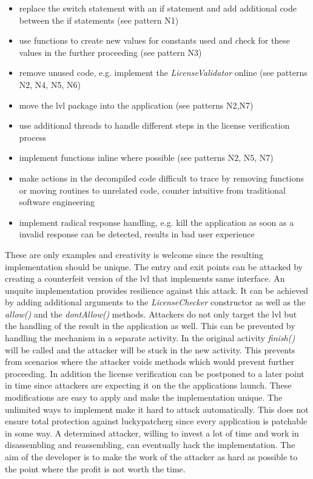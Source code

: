 \begin{itemize}
\item replace the switch statement with an if statement and add additional code between the if statements (see pattern N1)
\item use functions to create new values for constants used and check for these values in the further proceeding (see pattern N3)
\item remove unused code, e.g. implement the \textit{LicenseValidator} online (see patterns N2, N4, N5, N6)
\item move the \gls{lvl} package into the application (see patterns N2,N7)
\item use additional threads to handle different steps in the license verification process
\item implement functions inline where possible (see patterns N2, N5, N7)
\item make actions in the decompiled code difficult to trace by removing functions or moving routines to unrelated code, counter intuitive from traditional software engineering
\item implement radical response handling, e.g. kill the application as soon as a invalid response can be detected, results in bad user experience
\end{itemize}
These are only examples and creativity is welcome since the resulting implementation should be unique. \cite{developersSecuring}
\newline
The entry and exit points can be attacked by creating a counterfeit version of the \gls{lvl} that implements same interface.
An unquite implementation provides resilience against this attack.
It can be achieved by adding additional arguments to the \textit{LicenseChecker} constructor as well as the \textit{allow()} and the \textit{dontAllow()} methods. \cite{developersSecuring}
\newline
Attackers do not only target the \gls{lvl} but the handling of the result in the application as well.
This can be prevented by handling the mechanism in a separate activity.
In the original activity \textit{finish()} will be called and the attacker will be stuck in the new activity.
This prevents from scenarios where the attacker voids methods which would prevent further proceeding.
In addition the license verification can be postponed to a later point in time since attackers are expecting it on the the applications launch. \cite{developersSecuring}
\newline
These modifications are easy to apply and make the implementation unique.
The unlimited ways to implement make it hard to attack automatically.
This does not ensure total protection against \gls{luckypatcherg} since every application is patchable in some way.
A determined attacker, willing to invest a lot of time and work in disassembling and reassembling, can eventually hack the implementation.
The aim of the developer is to make the work of the attacker as hard as possible to the point where the profit is not worth the time. \cite{developersSecuring}
